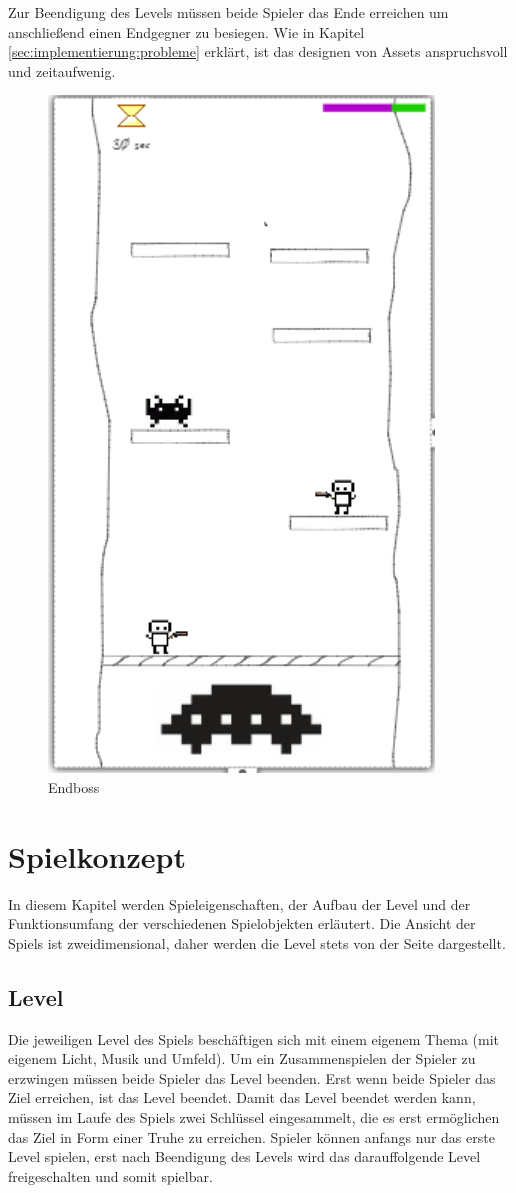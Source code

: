 Zur Beendigung des Levels müssen beide Spieler das Ende erreichen um anschließend einen Endgegner zu besiegen. Wie in Kapitel \ref{sec:implementierung:probleme} erklärt, ist das designen von Assets anspruchsvoll und zeitaufwenig.
\begin{figure}[H]
    \begin{center}
      \includegraphics[width=.22\linewidth]{img/konzeption/EndBoss}
      \caption{Endboss}
      \label{fig:konzeption:prototyping:endboss}
    \end{center}
\end{figure}

\section{Spielkonzept}
\label{sec:konzeption:konzept}
In diesem Kapitel werden Spieleigenschaften, der Aufbau der Level und der Funktionsumfang der verschiedenen Spielobjekten erläutert. Die Ansicht der Spiels ist zweidimensional, daher werden die Level stets von der Seite dargestellt.

\subsection{Level}
\label{sec:konzeption:konzept:level}
 Die jeweiligen Level des Spiels beschäftigen sich mit einem eigenem Thema (mit eigenem Licht, Musik und Umfeld). Um ein Zusammenspielen der Spieler zu erzwingen müssen beide Spieler das Level beenden. Erst wenn beide Spieler das Ziel erreichen, ist das Level beendet. Damit das Level beendet werden kann, müssen im Laufe des Spiels zwei Schlüssel eingesammelt, die es erst ermöglichen das Ziel in Form einer Truhe zu erreichen. Spieler können anfangs nur das erste Level spielen, erst nach Beendigung des Levels wird das darauffolgende Level freigeschalten und somit spielbar. 

